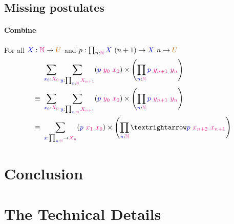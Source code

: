 \documentclass[twoside,11pt,openright]{report}
\newcommand*{\term}[1]{\textcolor{blue!80!black}{#1}}
\newcommand*{\type}[1]{\textcolor{magenta!90!black}{#1}}
\newcommand*{\universe}[1]{\textcolor{orange!80!black}{#1}}
\begin{document}
\section{Missing postulates}
\subsubsection{Combine}
For all \(\term{X} : \type{\mathbb{N}} \rightarrow \universe{U}\) and \(p : \prod_{n : \type{\mathbb{N}}} \term{X}~(n + 1) \rightarrow \term{X}~n \rightarrow \universe{U}\)
\begin{align}
  &~\sum_{\term{x_0} : \type{X_0}} \sum_{\term{y} : \prod_{\term{n} : \type{\mathbb{N}}} \type{X_{n+1}}} (\term{p}~\type{y_0}~\type{x_0}) \times \left(\prod_{\term{n} : \type{\mathbb{N}}} \term{p}~\type{y_{n + 1}}~\type{y_n}\right) \\
  \equiv&~\sum_{\term{x_0} : \type{X_0}} \sum_{\term{y} : \prod_{\term{n} : \type{\mathbb{N}}} \type{X_{n+1}}} (\term{p}~\type{y_0}~\type{x_0}) \times \left(\prod_{\term{n} : \type{\mathbb{N}}} \term{p}~\type{y_{n + 1}}~\type{y_n}\right) \\
  \equiv&~\sum_{\term{x} : \prod_{\term{n} : \type{\mathbb{N}}} \rightarrow \type{X_n}} (\term{p}~\type{x_1}~\type{x_0}) \times \left(\prod_{\term{n} : \type{\mathbb{N}}} → \term{p}~\type{x_{n+2}}~\type{x_{n+1}}\right)
\end{align}

\chapter{Conclusion}
\label{ch:conclusion}



\cleardoublepage
{}
 



\cleardoublepage
\appendix
\chapter{The Technical Details}

\todo[inline]{\dots}
\end{document}

